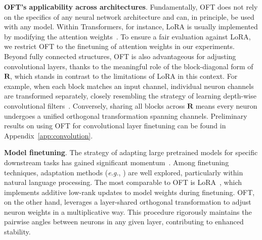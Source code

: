 \textbf{OFT’s applicability across architectures}. Fundamentally, OFT does not rely on the specifics of any neural network architecture and can, in principle, be used with any model. Within Transformers, for instance, LoRA is usually implemented by modifying the attention weights~\cite{hulora2022}. To ensure a fair evaluation against LoRA, we restrict OFT to the finetuning of attention weights in our experiments. Beyond fully connected structures, OFT is also advantageous for adjusting convolutional layers, thanks to the meaningful role of the block-diagonal form of $\bm{R}$, which stands in contrast to the limitations of LoRA in this context. For example, when each block matches an input channel, individual neuron channels are transformed separately, closely resembling the strategy of learning depth-wise convolutional filters~\cite{chollet2017xception}. Conversely, sharing all blocks across $\bm{R}$ means every neuron undergoes a unified orthogonal transformation spanning channels. Preliminary results on using OFT for convolutional layer finetuning can be found in Appendix~\ref{app:convolution}.

\textbf{Model finetuning}. The strategy of adapting large pretrained models for specific downstream tasks has gained significant momentum~\cite{devlin2018bert,brown2020language,he2022masked}. Among finetuning techniques, adaptation methods (\emph{e.g.}, \cite{hulora2022,houlsby2019parameter,pfeiffer2020adapterfusion}) are well explored, particularly within natural language processing. The most comparable to OFT is LoRA~\cite{hulora2022}, which implements additive low-rank updates to model weights during finetuning. OFT, on the other hand, leverages a layer-shared orthogonal transformation to adjust neuron weights in a multiplicative way. This procedure rigorously maintains the pairwise angles between neurons in any given layer, contributing to enhanced stability.

